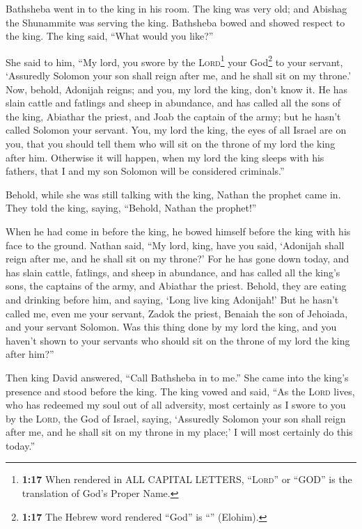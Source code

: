  Bathsheba went in to the king in his room. The king was
very old; and Abishag the Shunammite was serving the king.
 Bathsheba bowed and showed respect to the king. The king
said, ``What would you like?''

 She said to him, ``My lord, you swore by the
\textsc{Lord}\footnote{\textbf{1:17} When rendered in ALL CAPITAL
  LETTERS, ``\textsc{Lord}'' or ``GOD'' is the translation of God's
  Proper Name.} your God\footnote{\textbf{1:17} The Hebrew word rendered
  ``God'' is ``'' (Elohim).} to your servant, `Assuredly
Solomon your son shall reign after me, and he shall sit on my throne.'
 Now, behold, Adonijah reigns; and you, my lord the king,
don't know it.  He has slain cattle and fatlings and
sheep in abundance, and has called all the sons of the king, Abiathar
the priest, and Joab the captain of the army; but he hasn't called
Solomon your servant.  You, my lord the king, the eyes of
all Israel are on you, that you should tell them who will sit on the
throne of my lord the king after him.  Otherwise it will
happen, when my lord the king sleeps with his fathers, that I and my son
Solomon will be considered criminals.''

 Behold, while she was still talking with the king,
Nathan the prophet came in.  They told the king, saying,
``Behold, Nathan the prophet!''

When he had come in before the king, he bowed himself before the king
with his face to the ground.  Nathan said, ``My lord,
king, have you said, `Adonijah shall reign after me, and he shall sit on
my throne?'  For he has gone down today, and has slain
cattle, fatlings, and sheep in abundance, and has called all the king's
sons, the captains of the army, and Abiathar the priest. Behold, they
are eating and drinking before him, and saying, `Long live king
Adonijah!'  But he hasn't called me, even me your
servant, Zadok the priest, Benaiah the son of Jehoiada, and your servant
Solomon.  Was this thing done by my lord the king, and
you haven't shown to your servants who should sit on the throne of my
lord the king after him?''

 Then king David answered, ``Call Bathsheba in to me.''
She came into the king's presence and stood before the king.
 The king vowed and said, ``As the \textsc{Lord} lives,
who has redeemed my soul out of all adversity,  most
certainly as I swore to you by the \textsc{Lord}, the God of Israel,
saying, `Assuredly Solomon your son shall reign after me, and he shall
sit on my throne in my place;' I will most certainly do this today.''

